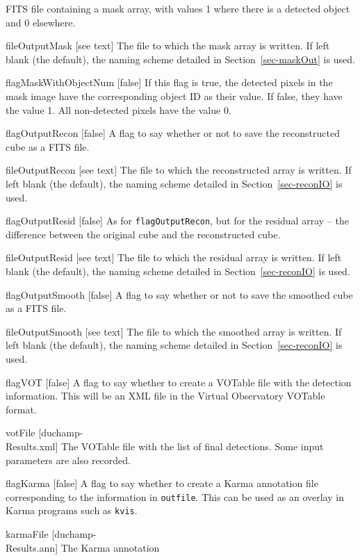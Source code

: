 \begin{Lentry}
  FITS file containing a mask array, with values 1 where there is a
  detected object and 0 elsewhere. 
\item[fileOutputMask{ [see text]}] The file to which the mask array is
  written. If left blank (the default), the naming scheme detailed in
  Section~\ref{sec-maskOut} is used.
\item[{flagMaskWithObjectNum [false]}] If this flag is true, the
  detected pixels in the mask image have the corresponding object ID
  as their value. If false, they have the value 1. All non-detected
  pixels have the value 0.
\item[{flagOutputRecon [false]}] A flag to say whether or not
  to save the reconstructed cube as a FITS file. 
\item[fileOutputRecon{ [see text]}] The file to which the reconstructed array
  is written. If left blank (the default), the naming scheme detailed
  in Section~\ref{sec-reconIO} is used.
\item[{flagOutputResid [false]}] As for
  \texttt{flagOutputRecon}, but for the residual array -- the
  difference between the original cube and the reconstructed cube. 
\item[fileOutputResid{ [see text]}] The file to which the residual array
  is written. If left blank (the default), the naming scheme detailed
  in Section~\ref{sec-reconIO} is used.
\item[{flagOutputSmooth [false]}] A flag to say whether or not
  to save the smoothed cube as a FITS file. 
\item[fileOutputSmooth{ [see text]}] The file to which the smoothed array
  is written. If left blank (the default), the naming scheme detailed
  in Section~\ref{sec-reconIO} is used.
\item[{flagVOT [false]}] A flag to say whether to create a
  VOTable file with the detection information. This will be an XML
  file in the Virtual Observatory VOTable format.
\item[{votFile [duchamp-\\Results.xml]}] The VOTable file with
  the list of final detections. Some input parameters are also
  recorded. 
\item[{flagKarma [false]}] A flag to say whether to create a
  Karma annotation file corresponding to the information in
  \texttt{outfile}. This can be used as an overlay in Karma
  programs such as \texttt{kvis}.
\item[{karmaFile [duchamp-\\Results.ann]}] The Karma annotation

\end{Lentry}
